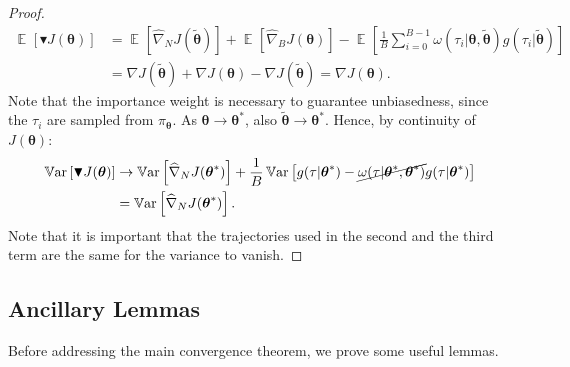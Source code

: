 \documentclass{article}
\theoremstyle{remark}
\theoremstyle{definition}
\DeclareMathOperator*{\EV}{\mathbb{E}}
\DeclareMathOperator*{\Var}{\mathbb{V}ar}
\newcommand{\EVV}[2][\ppvect \in \ppspace]{\EV_{#1}\left[{#2}\right]}
\newcommand{\vtheta}{\boldsymbol{\theta}}
\newcommand{\gradJ}[1]{\nabla J(#1)}
\newcommand{\gradApp}[2]{\widehat{\nabla}_{#2}J(#1)}
\newcommand{\gradBlack}[1]{\blacktriangledown J(#1)}
\newcommand{\wt}[1]{\widetilde{#1}}
\begin{document}
\svrpgprop*
\begin{proof}
\begin{align*}
        \EVV[]{\gradBlack{\vtheta}} &= \EVV[]{\gradApp{\wt{\vtheta}}{N}}  + \EVV[]{\gradApp{\vtheta}{B}} - \EVV[]{\frac{1}{B}\sum_{i=0}^{B-1}\omega(\tau_i|\vtheta, \wt{\vtheta}) g(\tau_i|\wt{\vtheta})} \\
&= \gradJ{\wt{\vtheta}} + \gradJ{\vtheta} - \gradJ{\wt{\vtheta}} = \gradJ{\vtheta}.
\end{align*}
Note that the importance weight is necessary to guarantee unbiasedness, since the $\tau_i$ are sampled from $\pi_{\vtheta}$.
As $\vtheta\to\vtheta^*$, also $\wt{\vtheta}\to\vtheta^*$. Hence, by continuity of $J(\vtheta)$:
	\begin{align*}
\Var\left[\gradBlack{\vtheta}\right] &\to \Var\left[\gradApp{\vtheta^*}{N}\right] + \frac{1}{B}\Var\left[g(\tau|\vtheta^*) - \cancel{\omega(\tau|\vtheta^*,\vtheta^*)}g(\tau|\vtheta^*)\right] \\
&= \Var\left[\gradApp{\vtheta^*}{N}\right].
\end{align*}
Note that it is important that the trajectories used in the second and the third term are the same for the variance to vanish.
\end{proof}

\subsection*{Ancillary Lemmas}
Before addressing the main convergence theorem, we prove some useful lemmas.
\end{document}
